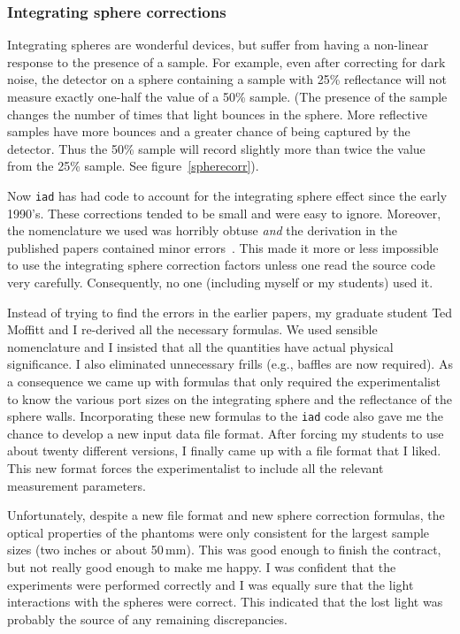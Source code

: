 \documentclass{article}
\newcommand\iadprog{\texttt{iad}}
\begin{document}
\subsubsection*{Integrating sphere corrections}

Integrating spheres are wonderful devices, but 
suffer from having a non-linear response to the presence of a sample.  For 
example, even after correcting for dark noise, the detector on a sphere 
containing a sample with 25\% reflectance will not measure exactly one-half 
the value of a 50\% sample. (The presence of the sample changes the number
of times that light bounces in the sphere.  More reflective samples have
more bounces and a greater chance of being captured by the detector.  Thus
the 50\% sample will record slightly more than twice the value from the
25\% sample.  See figure~\ref{spherecorr}).

Now \iadprog{} has had code to account for the integrating sphere effect since
the early 1990's.  These
corrections tended to be small and were easy to ignore.  Moreover,
the nomenclature we used was horribly obtuse \textit{and} the derivation in the published
papers contained minor errors~\cite{pickering93a}.  This made it more or less impossible
to use the integrating sphere correction factors unless one read the source
code very carefully.  Consequently, no one (including myself or my students)
used it.  

Instead of trying to find the errors in the earlier papers, my graduate
student Ted Moffitt and I re-derived all the necessary formulas.  We used
sensible nomenclature and I insisted that all the quantities have actual
physical significance.  I also eliminated unnecessary frills (e.g., baffles
are now required).  As a consequence we came up with formulas that 
only required the experimentalist to know the various port sizes on the
integrating sphere and the reflectance of the sphere walls.  
Incorporating these new formulas to the \iadprog{} code also gave me the chance
to develop a new input data file format.  After forcing my students to use about 
twenty different versions,
I finally came up with a file format that I liked.  This new format forces
the experimentalist to include all the relevant measurement parameters.  

Unfortunately, despite a new file format and new sphere correction formulas,
the optical properties of the phantoms were only consistent for the largest
sample sizes (two inches or about 50\,mm).  This was good enough to finish
the contract, but not really good enough to make me happy.  I was confident
that the experiments were performed correctly and I was equally sure that
the light interactions with the spheres were correct.  This indicated that the
lost light was probably the source of any remaining discrepancies.
\end{document}
